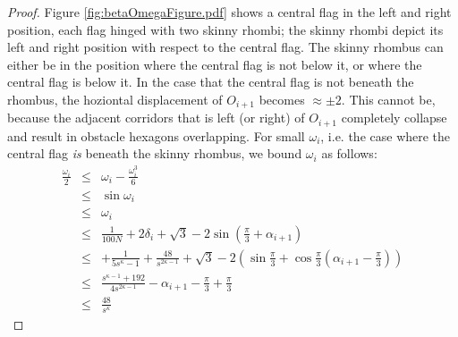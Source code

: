 \documentclass[10pt]{CSUNthesis}
\theoremstyle{plain}%
\theoremstyle{definition}
\theoremstyle{remark}
\newcommand{\lr}[1]{\left( #1 \right)}
\begin{document}
\begin{proof}
Figure \ref{fig:betaOmegaFigure.pdf} shows a central flag in the left and right position, each flag hinged with two skinny rhombi; the skinny rhombi depict its left and right position with respect to the central flag.
The skinny rhombus can either be in the position where the central flag is not below it, or where the central flag is below it.  
In the case that the central flag is not beneath the rhombus, the hoziontal displacement of $O_{i+1}$ becomes $\approx \pm 2$.  
This cannot be, because the adjacent corridors that is left (or right) of $O_{i+1}$ completely collapse and result in obstacle hexagons overlapping.
For small $\omega_i$, i.e. the case where the central flag \textit{is} beneath the skinny rhombus, we bound $\omega_i$ as follows:
\begin{eqnarray*}
\frac{\omega_i}{2}&\leq& \omega_i - \frac{\omega_i^3}{6} \\
&\leq& \sin \omega_i\\
&\leq& \omega_i \\
&\leq& \frac{1}{100N} + 2 \delta_i + \sqrt{3}- 2 \sin \lr{\frac{\pi}{3} + \alpha_{i+1}}\\
&\leq&+ \frac{1}{5s^\kappa - 1} + \frac{48}{s^{2\kappa - 1}} +\sqrt{3} - 2 \lr{\sin \frac{\pi}{3} + \cos \frac{\pi}{3} \lr{\alpha_{i+1} - \frac{\pi}{3} } }\\
&\leq&  \frac{s^{\kappa-1} + 192}{4 s^{2\kappa-1}} - \alpha_{i+1} - \frac{\pi}{3} + \frac{\pi}{3}\\
&\leq& \frac{48}{s^\kappa}
\end{eqnarray*}


\end{proof}
\end{document}
